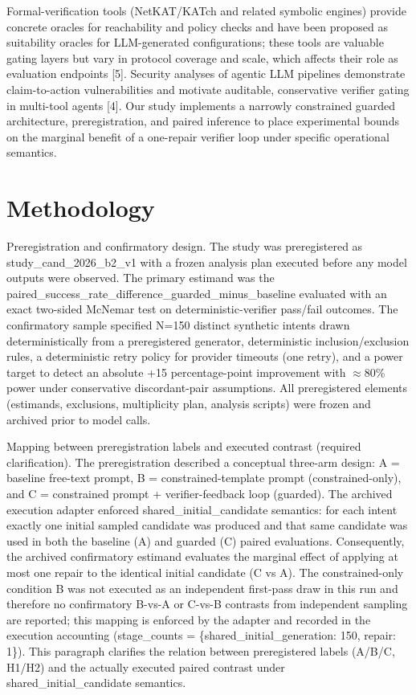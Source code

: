 \documentclass[conference]{IEEEtran}
\begin{document}
Formal-verification tools (NetKAT/KATch and related symbolic engines) provide concrete oracles for reachability and policy checks and have been proposed as suitability oracles for LLM-generated configurations; these tools are valuable gating layers but vary in protocol coverage and scale, which affects their role as evaluation endpoints [5]. Security analyses of agentic LLM pipelines demonstrate claim-to-action vulnerabilities and motivate auditable, conservative verifier gating in multi-tool agents [4]. Our study implements a narrowly constrained guarded architecture, preregistration, and paired inference to place experimental bounds on the marginal benefit of a one-repair verifier loop under specific operational semantics.

\section{Methodology}
Preregistration and confirmatory design. The study was preregistered as study\_cand\_2026\_b2\_v1 with a frozen analysis plan executed before any model outputs were observed. The primary estimand was the paired\_success\_rate\_difference\_guarded\_minus\_baseline evaluated with an exact two-sided McNemar test on deterministic-verifier pass/fail outcomes. The confirmatory sample specified N=150 distinct synthetic intents drawn deterministically from a preregistered generator, deterministic inclusion/exclusion rules, a deterministic retry policy for provider timeouts (one retry), and a power target to detect an absolute +15 percentage-point improvement with \ensuremath{\approx}80\% power under conservative discordant-pair assumptions. All preregistered elements (estimands, exclusions, multiplicity plan, analysis scripts) were frozen and archived prior to model calls.

Mapping between preregistration labels and executed contrast (required clarification). The preregistration described a conceptual three-arm design: A = baseline free-text prompt, B = constrained-template prompt (constrained-only), and C = constrained prompt + verifier-feedback loop (guarded). The archived execution adapter enforced shared\_initial\_candidate semantics: for each intent exactly one initial sampled candidate was produced and that same candidate was used in both the baseline (A) and guarded (C) paired evaluations. Consequently, the archived confirmatory estimand evaluates the marginal effect of applying at most one repair to the identical initial candidate (C vs A). The constrained-only condition B was not executed as an independent first-pass draw in this run and therefore no confirmatory B-vs-A or C-vs-B contrasts from independent sampling are reported; this mapping is enforced by the adapter and recorded in the execution accounting (stage\_counts = \{shared\_initial\_generation: 150, repair: 1\}). This paragraph clarifies the relation between preregistered labels (A/B/C, H1/H2) and the actually executed paired contrast under shared\_initial\_candidate semantics.
\end{document}

